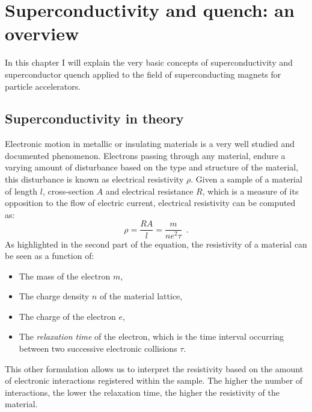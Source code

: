 \chapter{Superconductivity and quench: an overview}
\label{chp:soupcond-quench}
In this chapter I will explain the very basic concepts of superconductivity and
superconductor quench applied to the field of superconducting magnets for particle accelerators.
\section{Superconductivity in theory}
\label{sec:soupcond}
Electronic motion in metallic or insulating materials is a very well studied and documented
phenomenon. Electrons passing through any material, endure a varying amount of disturbance based on
the type and structure of the material, this disturbance is known as electrical resistivity $\rho$. Given a
sample of a material of length $l$, cross-section $A$ and electrical resistance $R$, which is a
measure of its opposition to the flow of electric current, electrical resistivity can be computed
as:
\begin{equation}
	\label{eq:resistivity-cable}
	\rho = \frac{RA}{l} = \frac{m}{ne^2\tau} \enspace.
\end{equation}
As highlighted in the second part of the equation, the resistivity of a material can be seen as a function of:
\begin{itemize}
	\item The mass of the electron $m$,
	\item The charge density $n$ of the material lattice,
	\item The charge of the electron $e$,
	\item The \emph{relaxation time} of the electron, which is the time interval occurring between two
	      successive electronic collisions $\tau$.
\end{itemize}
This other formulation allows us to interpret the resistivity based on the amount of electronic
interactions registered within the sample. The higher the number of interactions, the lower the
relaxation time, the higher the resistivity of the material.

